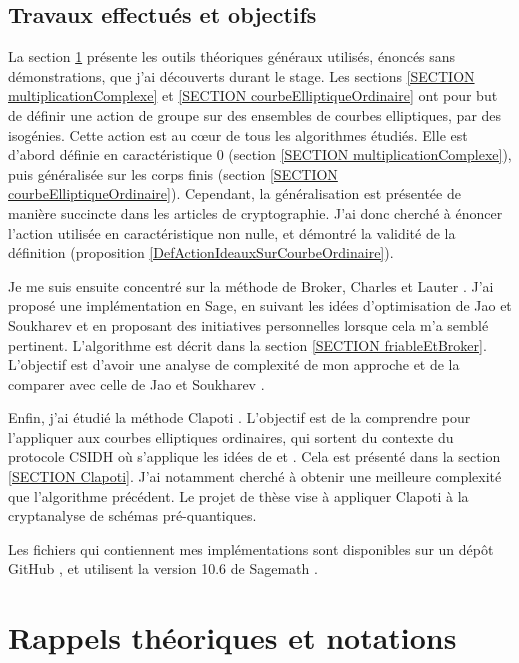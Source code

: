 \subsection{Travaux effectués et objectifs}

La section \ref{SECTION RappelNotations} présente les outils théoriques généraux utilisés, énoncés sans démonstrations, que j'ai découverts durant le stage. Les sections \ref{SECTION multiplicationComplexe} et \ref{SECTION courbeElliptiqueOrdinaire} ont pour but de définir une action de groupe sur des ensembles de courbes elliptiques, par des isogénies. Cette action est au cœur de tous les algorithmes étudiés. Elle est d'abord définie en caractéristique $0$ (section \ref{SECTION multiplicationComplexe}), puis généralisée sur les corps finis (section \ref{SECTION courbeElliptiqueOrdinaire}). Cependant, la généralisation est présentée de manière succincte dans les articles de cryptographie. J'ai donc cherché à énoncer l'action utilisée en caractéristique non nulle, et démontré la validité de la définition (proposition \ref{DefActionIdeauxSurCourbeOrdinaire}).

Je me suis ensuite concentré sur la méthode de Broker, Charles et Lauter \cite{BrokerCharlesLauter}. J'ai proposé une implémentation en Sage, en suivant les idées d'optimisation de Jao et Soukharev \cite{JaoSoukharev} et en proposant des initiatives personnelles lorsque cela m'a semblé pertinent. L'algorithme est décrit dans la section \ref{SECTION friableEtBroker}. L'objectif est d'avoir une analyse de complexité de mon approche et de la comparer avec celle de Jao et Soukharev \cite{JaoSoukharev}.

Enfin, j'ai étudié la méthode Clapoti \cite{Clapoti}. L'objectif est de la comprendre pour l'appliquer aux courbes elliptiques ordinaires, qui sortent du contexte du protocole CSIDH où s'applique les idées de \cite{KLaPoTi} et \cite{Pegasis}. Cela est présenté dans la section \ref{SECTION Clapoti}. J'ai notamment cherché à obtenir une meilleure complexité que l'algorithme précédent. Le projet de thèse vise à appliquer Clapoti à la cryptanalyse de schémas pré-quantiques.

Les fichiers qui contiennent mes implémentations sont disponibles sur un dépôt GitHub \cite{GITHUBRapportStage}, et utilisent la version 10.6 de Sagemath \cite{sage}. 

\newpage

\section{Rappels théoriques et notations}\label{SECTION RappelNotations}

